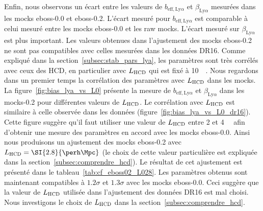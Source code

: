 Enfin, nous observons un écart entre les valeurs de $b_{\mathrm{eff},\mathrm{Ly}\alpha}$ et $\beta_{\mathrm{Ly}\alpha}$ mesurées dans les mocks eboss-0.0 et eboss-0.2. L'écart mesuré pour $b_{\mathrm{eff},\mathrm{Ly}\alpha}$ est comparable à celui mesuré entre les mocks eboss-0.0 et les raw mocks.
L'écart mesuré sur $\beta_{\mathrm{Ly}\alpha}$ est plus important. Les valeurs obtenues dans l'ajustement des mocks eboss-0.2 ne sont pas compatibles avec celles mesurées dans les données DR16.
Comme expliqué dans la section~\ref{subsec:stab_pars_lya}, les paramètres \lya{} sont très corrélés avec ceux des HCD, en particulier avec $L_{\textsc{HCD}}$ qui est fixé à \SI{10}{\perh\Mpc}.
Nous regardons dans un premier temps la corrélation des paramètres \lya{} avec $L_{\textsc{HCD}}$ dans les mocks. La figure~\ref{fig:bias_lya_vs_L0} présente la mesure de $b_{\mathrm{eff},\mathrm{Ly}\alpha}$ et $\beta_{\mathrm{Ly}\alpha}$ dans les mocks-0.2 pour différentes valeurs de $L_{\textsc{HCD}}$. Le corrélation avec $L_{\textsc{HCD}}$ est similaire à celle observée dans les données (figure~\ref{fig:bias_lya_vs_L0_dr16}).
Cette figure suggère qu'il faut utiliser une valeur de $L_{\textsc{HCD}}$ entre 2 et \SI{4}{\perh\Mpc} afin d'obtenir une mesure des paramètres \lya{} en accord avec les mocks eboss-0.0.
Ainsi nous produisons un ajustement des mocks eboss-0.2 avec $L_{\textsc{HCD}} = \SI{2.8}{\perh\Mpc}$ (le choix de cette valeur particulière est expliquée dans la section~\ref{subsec:comprendre_hcd}).
Le résultat de cet ajustement est présenté dans le tableau~\ref{tab:cf_eboss02_L028}.
Les paramètres \lya{} obtenus sont maintenant compatibles à $\num{1.2} \sigma$ et $\num{1.3} \sigma$  avec les mocks eboss-0.0.
Ceci suggère que la valeur de $L_{\textsc{HCD}}$ utilisée dans l'ajustement des données DR16 est mal choisi. Nous investigons le choix de $L_{\textsc{HCD}}$ dans la section~\ref{subsec:comprendre_hcd}.

